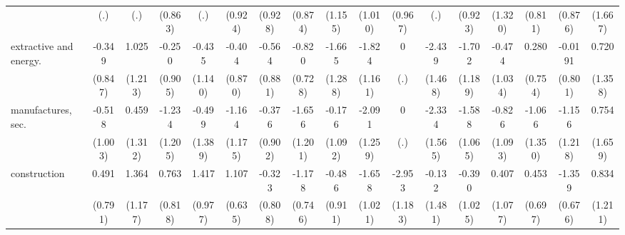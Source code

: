 {\begin{tabular}{l*{16}{c}}
                    &         (.)         &         (.)         &     (0.863)         &         (.)         &     (0.924)         &     (0.928)         &     (0.874)         &     (1.155)         &     (1.010)         &     (0.967)         &         (.)         &     (0.923)         &     (1.320)         &     (0.811)         &     (0.876)         &     (1.667)         \\
[1em]
extractive and energy.&      -0.349         &       1.025         &      -0.250         &      -0.435         &      -0.404         &      -0.564         &      -0.820         &      -1.665         &      -1.824         &           0         &      -2.439         &      -1.702         &      -0.474         &       0.280         &     -0.0191         &       0.720         \\
                    &     (0.847)         &     (1.213)         &     (0.905)         &     (1.140)         &     (0.870)         &     (0.881)         &     (0.728)         &     (1.288)         &     (1.161)         &         (.)         &     (1.468)         &     (1.189)         &     (1.034)         &     (0.754)         &     (0.801)         &     (1.358)         \\
[1em]
manufactures, sec.  &      -0.518         &       0.459         &      -1.234         &      -0.499         &      -1.164         &      -0.376         &      -1.656         &      -0.176         &      -2.091         &           0         &      -2.334         &      -1.588         &      -0.826         &      -1.066         &      -1.156         &       0.754         \\
                    &     (1.003)         &     (1.312)         &     (1.205)         &     (1.389)         &     (1.175)         &     (0.902)         &     (1.201)         &     (1.092)         &     (1.259)         &         (.)         &     (1.565)         &     (1.065)         &     (1.093)         &     (1.350)         &     (1.218)         &     (1.659)         \\
[1em]
construction        &       0.491         &       1.364         &       0.763         &       1.417         &       1.107         &      -0.323         &      -1.178         &      -0.486         &      -1.658         &      -2.953\sym{*}  &      -0.132         &      -0.390         &       0.407         &       0.453         &      -1.359\sym{*}  &       0.834         \\
                    &     (0.791)         &     (1.177)         &     (0.818)         &     (0.977)         &     (0.635)         &     (0.808)         &     (0.746)         &     (0.911)         &     (1.021)         &     (1.183)         &     (1.481)         &     (1.025)         &     (1.077)         &     (0.697)         &     (0.676)         &     (1.211)         \\

\end{tabular}}
